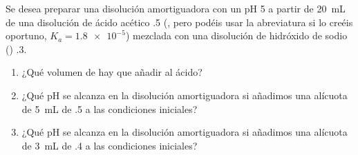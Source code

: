 Se desea preparar una disolución amortiguadora con un pH 5 a partir de \SI{20}{\milli\liter} de una disolución de ácido acético \SI{,5}{\Molar} (, pero podéis usar la abreviatura  si lo creéis oportuno, $K_a = \num{1,8e-5}$) mezclada con una disolución de hidróxido de sodio () \SI{,3}{\Molar}.
\begin{enumerate}%
	\item ¿Qué volumen de  hay que añadir al ácido?
	\item ¿Qué pH se alcanza en la disolución amortiguadora si añadimos una alícuota de \SI{5}{\milli\liter} de  \SI{,5}{\Molar} a las condiciones iniciales?
	\item ¿Qué pH se alcanza en la disolución amortiguadora si añadimos una alícuota de \SI{3}{\milli\liter} de  \SI{,4}{\Molar} a las condiciones iniciales?
\end{enumerate}
